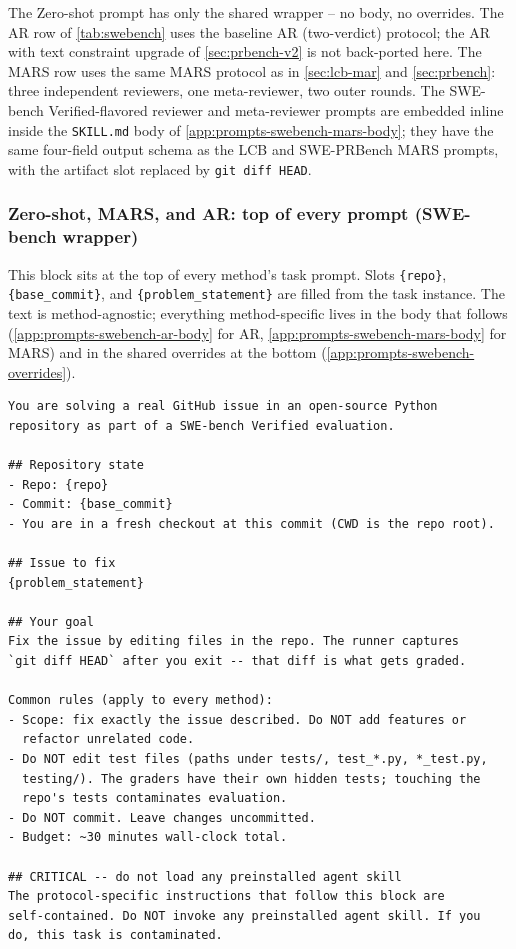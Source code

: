 \documentclass{article}
\begin{document}
The Zero-shot prompt has only the shared wrapper -- no body, no
overrides. The AR row of \autoref{tab:swebench} uses the baseline AR
(two-verdict) protocol; the AR with text constraint upgrade of
\autoref{sec:prbench-v2} is not back-ported here. The MARS row uses
the same MARS protocol as in \autoref{sec:lcb-mar} and
\autoref{sec:prbench}: three independent reviewers, one
meta-reviewer, two outer rounds. The SWE-bench Verified-flavored
reviewer and meta-reviewer prompts are embedded inline inside the
\texttt{SKILL.md} body of \autoref{app:prompts-swebench-mars-body};
they have the same four-field output schema as the LCB and
SWE-PRBench MARS prompts, with the artifact slot replaced by
\texttt{git diff HEAD}.

\subsubsection{Zero-shot, MARS, and AR: top of every prompt (SWE-bench wrapper)}
\label{app:prompts-swebench-wrapper}
\label{app:prompts-swebench-ar-wrapper}

This block sits at the top of every method's task prompt. Slots
\texttt{\{repo\}}, \texttt{\{base\_commit\}}, and
\texttt{\{problem\_statement\}} are filled from the task instance.
The text is method-agnostic; everything method-specific lives in the
body that follows (\autoref{app:prompts-swebench-ar-body} for AR,
\autoref{app:prompts-swebench-mars-body} for MARS) and in the shared
overrides at the bottom (\autoref{app:prompts-swebench-overrides}).

\begin{footnotesize}
\begin{verbatim}
You are solving a real GitHub issue in an open-source Python
repository as part of a SWE-bench Verified evaluation.

## Repository state
- Repo: {repo}
- Commit: {base_commit}
- You are in a fresh checkout at this commit (CWD is the repo root).

## Issue to fix
{problem_statement}

## Your goal
Fix the issue by editing files in the repo. The runner captures
`git diff HEAD` after you exit -- that diff is what gets graded.

Common rules (apply to every method):
- Scope: fix exactly the issue described. Do NOT add features or
  refactor unrelated code.
- Do NOT edit test files (paths under tests/, test_*.py, *_test.py,
  testing/). The graders have their own hidden tests; touching the
  repo's tests contaminates evaluation.
- Do NOT commit. Leave changes uncommitted.
- Budget: ~30 minutes wall-clock total.

## CRITICAL -- do not load any preinstalled agent skill
The protocol-specific instructions that follow this block are
self-contained. Do NOT invoke any preinstalled agent skill. If you
do, this task is contaminated.
\end{verbatim}
\end{footnotesize}
\end{document}
